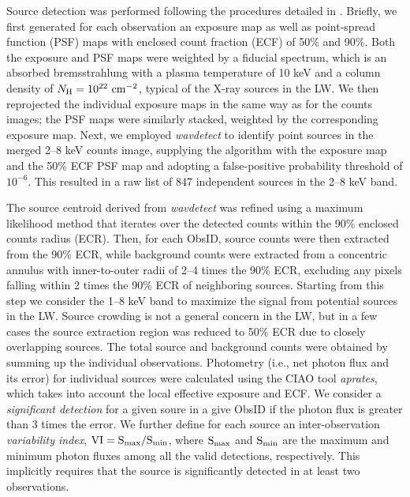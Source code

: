 \documentclass[twoside,twocolumn]{aastex63}
\begin{document}
Source detection was performed following the procedures detailed in \citet{2018ApJS..235...26Z}.
Briefly, we first generated for each observation an exposure map as well as point-spread function (PSF) maps with enclosed count fraction (ECF) of 50\% and 90\%. 
Both the exposure and PSF maps were weighted by a fiducial spectrum, which is an absorbed bremsstrahlung with a plasma temperature of 10 keV and a column density of $N_{\rm H}=10^{22}{\rm~cm^{-2}}$, typical of the X-ray sources in the LW. 
We then reprojected the individual exposure maps in the same way as for the counts images; the PSF maps were similarly stacked, weighted by the corresponding exposure map. 
Next, we employed {\it wavdetect} to identify point sources in the merged 2--8 keV counts image, supplying the algorithm  with the exposure map and the 50\% ECF PSF map and adopting a false-positive probability threshold of $10^{-6}$. 
This resulted in a raw list of 847 independent sources in the 2--8 keV band. 

The source centroid derived from {\it wavdetect} was refined using a maximum likelihood method that iterates over the detected counts within the 90\% enclosed counts radius (ECR).
Then, for each ObsID, source counts were then extracted from the 90\% ECR, while background counts were extracted from a concentric annulus with inner-to-outer radii of 2--4 times the 90\% ECR, excluding any pixels falling within 2 times the 90\% ECR of neighboring sources.
Starting from this step we consider the 1--8 keV band to maximize the signal from potential sources in the LW. 
Source crowding is not a general concern in the LW, but in a few cases the source extraction region was reduced to 50\% ECR due to closely overlapping sources. 
The total source and background counts were obtained by summing up the individual observations. 
Photometry (i.e., net photon flux and its error) for individual sources were calculated using the CIAO tool \emph{aprates}, which takes into account the local effective exposure and ECF. 
We consider a {\it significant detection} for a given soure in a give ObsID if the photon flux is greater than 3 times the error. 
We further define for each source an inter-observation {\it variability index}, $\rm VI=S_{max}/S_{min}$, where $\rm S_{max}$ and $\rm S_{min}$ are the maximum and minimum photon fluxes among all the valid detections, respectively. This implicitly requires that the source is significantly detected in at least two observations.
\end{document}

